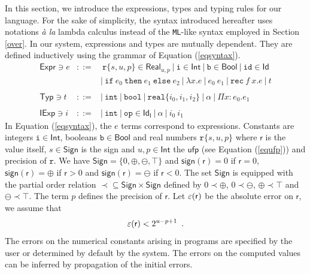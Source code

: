 In this section, we introduce the expressions, types and typing rules for our language.
For the sake of simplicity, the syntax introduced hereafter uses notations \textit{\`a la} lambda calculus
instead of the \texttt{ML}-like syntax employed in Section \ref{over}.
In our system, expressions and types are mutually dependent. They are defined inductively using the grammar of Equation (\ref{eqsyntax}).
\begin{equation}\label{eqsyntax}
\begin{array}{rcl}
\mathsf{Expr}\ni e&::=&\ \mathtt{r}\{s,u,p\}\in \mathsf{Real}_{u,p}\ |\ \mathtt{i}\in \mathsf{Int}
\ |\ \mathtt{b}\in \mathsf{Bool}\ |\ \mathtt{id}\in\mathsf{Id} \\
&&|\  \mathtt{if}\ e_0\ \mathtt{then}\ e_1\ \mathtt{else}\ e_2
\ |\ \lambda x.e
\ |\ e_0\ e_1\ |\ \mathtt{rec}\ f\ x.e\ |\ t\\
&&\\
\mathsf{Typ}\ni t&::=&|\ \mathtt{int}\ |\ \mathtt{bool}\ |\ \mathtt{real\{}i_0,i_1,i_2\mathtt{\}}\ |\ \alpha\ |\ \Pi x:e_0.e_1\\ 
&&\\
\mathsf{IExp}\ni i&::=&|\ \mathtt{int}\ |\ \mathtt{op}\in\mathsf{Id}_\mathsf{I}\ |\ \alpha
\ |\ i_0\ i_1
\end{array}
\end{equation}
In Equation (\ref{eqsyntax}), the $e$ terms correspond to expressions.
Constants are integers $\mathtt{i}\in \mathsf{Int}$, booleans $\mathtt{b}\in \mathsf{Bool}$ and real 
numbers  $\mathtt{r}\{s,u,p\}$ where $\mathsf{r}$
is the value itself, $s\in \mathsf{Sign}$ is the sign and $u,p\in \mathsf{Int}$ the $\mathsf{ufp}$ (see
Equation (\ref{equfp}))
and precision of $\mathtt{r}$. 
We have $\mathsf{Sign}=\{0,\oplus,\ominus,\top\}$ and $\mathsf{sign(r)}=0$ if $\mathsf{r}=0$,
$\mathsf{sign(r)}=\oplus$ if $\mathsf{r}>0$ and $\mathsf{sign(r)}=\ominus$ if $\mathsf{r}<0$.
The set $\mathsf{Sign}$ is equipped with the partial order relation $\prec\subseteq \mathsf{Sign}
\times \mathsf{Sign}$ defined by $0\prec \oplus$, $0\prec \ominus$, $\oplus\prec \top$ and 
$\ominus\prec \top$. The term $p$ defines the precision of $\mathsf{r}$. Let $\varepsilon(\mathsf{r})$
be the absolute error on $\mathsf{r}$, we assume that
\begin{equation}
\varepsilon(\mathsf{r})< 2^{u-p+1}\enspace .
\end{equation}
The errors on the numerical constants arising in programs are specified by the user or determined by default by 
the system. The errors on the computed values can be inferred by  propagation of the
initial errors.


